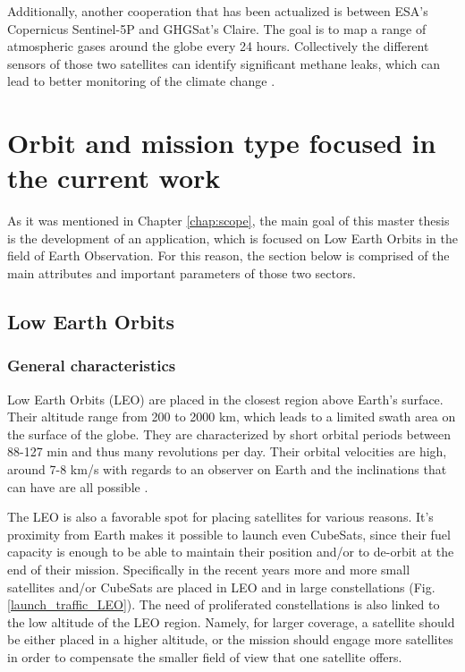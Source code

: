 Additionally, another cooperation that has been actualized is between ESA's Copernicus Sentinel-5P and GHGSat’s Claire. The goal is to map a range of atmospheric gases around the globe every 24 hours. Collectively the different sensors of those two satellites can identify significant methane leaks, which can lead to better monitoring of the climate change \cite{cooperation}. %


\bigskip
\section{Orbit and mission type focused in the current work}
\bigskip

As it was mentioned in Chapter \ref{chap:scope}, the main goal of this master thesis is the development of an application, which is focused on Low Earth Orbits in the field of Earth Observation. For this reason, the section below is comprised of the main attributes and important parameters of those two sectors.

\bigskip
\subsection{Low Earth Orbits}
\bigskip

\subsubsection{General characteristics}
\bigskip
Low Earth Orbits (LEO) are placed in the closest region above Earth's surface. Their altitude range from 200 to 2000 km, which leads to a limited swath area on the surface of the globe. They are characterized by short orbital periods between 88-127 min and thus many revolutions per day. Their orbital velocities are high, around 7-8 km/s with regards to an observer on Earth and the inclinations that can have are all possible \cite{Campbell}.

The LEO is also a favorable spot for placing satellites for various reasons. It's proximity from Earth makes it possible to launch even CubeSats, since their fuel capacity is enough to be able to maintain their position and/or to de-orbit at the end of their mission. Specifically in the recent years more and more small satellites and/or CubeSats are placed in LEO and in large constellations (Fig. \ref{launch_traffic_LEO}). The need of proliferated constellations is also linked to the low altitude of the LEO region. Namely, for larger coverage, a satellite should be either placed in a higher altitude, or the mission should engage more satellites in order to compensate the smaller field of view that one satellite offers.

